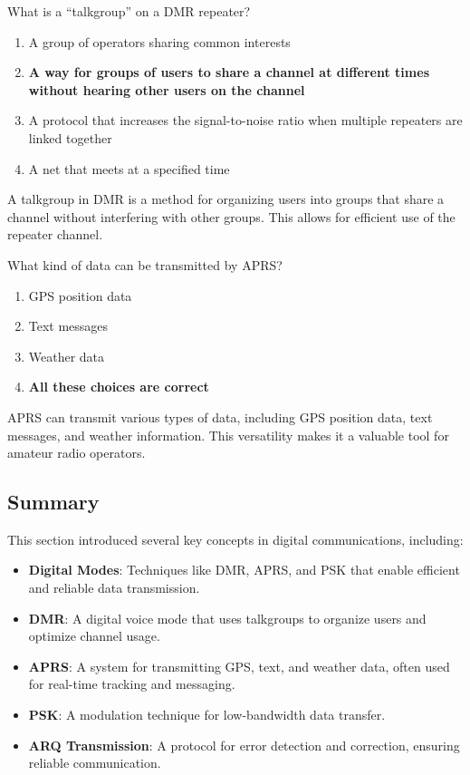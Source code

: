 
\begin{tcolorbox}[colback=gray!10!white,colframe=black!75!black,title={T8D02}]
    What is a “talkgroup” on a DMR repeater?
    \begin{enumerate}[label=\Alph*,noitemsep]
        \item A group of operators sharing common interests
        \item \textbf{A way for groups of users to share a channel at different times without hearing other users on the channel}
        \item A protocol that increases the signal-to-noise ratio when multiple repeaters are linked together
        \item A net that meets at a specified time
    \end{enumerate}
\end{tcolorbox}
A talkgroup in DMR is a method for organizing users into groups that share a channel without interfering with other groups. This allows for efficient use of the repeater channel.


\begin{tcolorbox}[colback=gray!10!white,colframe=black!75!black,title={T8D03}]
    What kind of data can be transmitted by APRS?
    \begin{enumerate}[label=\Alph*,noitemsep]
        \item GPS position data
        \item Text messages
        \item Weather data
        \item \textbf{All these choices are correct}
    \end{enumerate}
\end{tcolorbox}
APRS can transmit various types of data, including GPS position data, text messages, and weather information. This versatility makes it a valuable tool for amateur radio operators.


\subsection*{Summary}
This section introduced several key concepts in digital communications, including:
\begin{itemize}
    \item \textbf{Digital Modes}: Techniques like DMR, APRS, and PSK that enable efficient and reliable data transmission.
    \item \textbf{DMR}: A digital voice mode that uses talkgroups to organize users and optimize channel usage.
    \item \textbf{APRS}: A system for transmitting GPS, text, and weather data, often used for real-time tracking and messaging.
    \item \textbf{PSK}: A modulation technique for low-bandwidth data transfer.
    \item \textbf{ARQ Transmission}: A protocol for error detection and correction, ensuring reliable communication.
\end{itemize}
